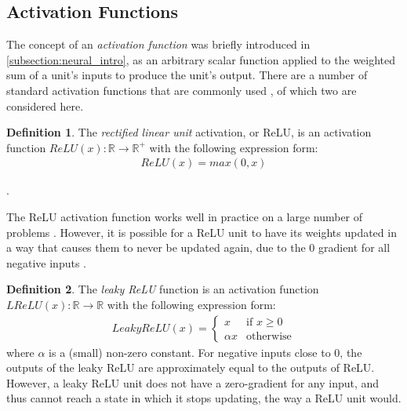 \documentclass[12pt, titlepage]{report}
\theoremstyle{definition}
\newtheorem{definition}{Definition}
\begin{document}
\subsection{Activation Functions}
The concept of an \emph{activation function} was briefly introduced in \ref{subsection:neural_intro}, as an arbitrary scalar function applied to the weighted sum of a unit's inputs to produce the unit's output. There are a number of standard activation functions that are commonly used \cite[Neural Networks Part 1: Setting up the Architecture]{karpathy2017cs231n}, of which two are considered here.

\begin{definition}
The \emph{rectified linear unit} activation, or ReLU, is an activation function $ReLU(x) : \mathbb{R} \rightarrow \mathbb{R}^{+}$ with the following expression form:
\begin{gather}\label{eq:relu}
ReLU(x) = max(0, x)
\end{gather}
\end{definition}.

The ReLU activation function works well in practice on a large number of problems \cite[Neural Networks Part 1: Setting up the Architecture]{karpathy2017cs231n}. However, it is possible for a ReLU unit to have its weights updated in a way that causes them to never be updated again, due to the 0 gradient for all negative inputs \cite[Neural Networks Part 1: Setting up the Architecture]{karpathy2017cs231n}. 

\begin{definition}
The \emph{leaky ReLU} function is an activation function $LReLU(x) : \mathbb{R} \rightarrow \mathbb{R}$ with the following expression form:
\begin{gather}\label{eq:leakyrelu}
LeakyReLU(x) = 
\begin{cases}
    x 							 & \text{if } x\geq 0\\
    \alpha{x}             & \text{otherwise}
\end{cases}
\end{gather}
where $\alpha$ is a (small) non-zero constant. For negative inputs close to 0, the outputs of the leaky ReLU are approximately equal to the outputs of ReLU. However, a leaky ReLU unit does not have a zero-gradient for any input, and thus cannot reach a state in which it stops updating, the way a ReLU unit would\cite[Neural Networks Part 1: Setting up the Architecture]{karpathy2017cs231n}.
\end{definition}
\end{document}
